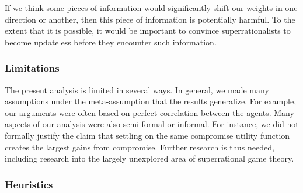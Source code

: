 If we think some pieces of information would significantly shift our
weights in one direction or another, then this piece of information is
potentially harmful. To the extent that it is possible, it would be
important to convince superrationalists to become updateless before they
encounter such information.

\subsubsection{Limitations}\label{limitations}

The present analysis is limited in several ways. In general, we made
many assumptions under the meta-assumption that the results generalize.
For example, our arguments were often based on perfect correlation
between the agents. Many aspects of our analysis were also semi-formal
or informal. For instance, we did not formally justify the claim that
settling on the same compromise utility function creates the largest
gains from compromise. Further research is thus needed, including
research into the largely unexplored area of superrational game theory.

\subsubsection{Heuristics}\label{heuristics}


